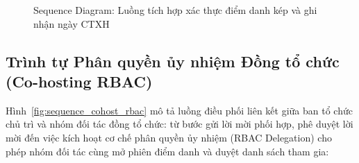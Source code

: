 \begin{figure}[H]
{
}
\caption{Sequence Diagram: Luồng tích hợp xác thực điểm danh kép và ghi nhận ngày CTXH}
\label{fig:sequence_diem_danh_gamification}
\end{figure}

\clearpage
\subsection{Trình tự Phân quyền ủy nhiệm Đồng tổ chức (Co-hosting RBAC)}

Hình~\ref{fig:sequence_cohost_rbac} mô tả luồng điều phối liên kết giữa ban tổ chức chủ trì và nhóm đối tác đồng tổ chức: từ bước gửi lời mời phối hợp, phê duyệt lời mời đến việc kích hoạt cơ chế phân quyền ủy nhiệm (RBAC Delegation) cho phép nhóm đối tác cùng mở phiên điểm danh và duyệt danh sách tham gia:


